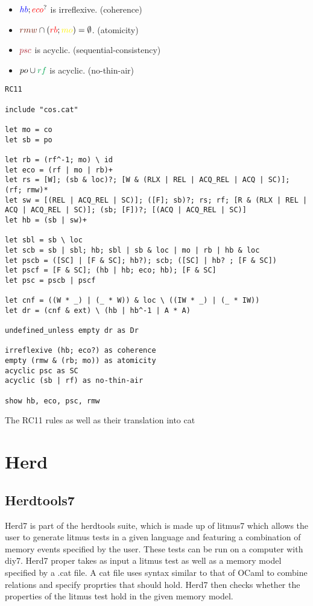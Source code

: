 \documentclass[a4,12pt]{article}
\newcommand{\hb}{{\color{blue}hb}}
\newcommand{\eco}{{\color{red}eco}}
\newcommand{\rmw}{{\color{Brown}rmw}}
\newcommand{\rb}{{\color{red}rb}}
\newcommand{\mo}{{\color{Yellow}mo}}
\newcommand{\psc}{{\color{Maroon}psc}}
\newcommand{\po}{po}
\newcommand{\rf}{{\color{Green}rf}}
\begin{document}
\begin{itemize}
\item $\hb ; \eco ^?$ is irreflexive. \hfill (coherence)
\item $\rmw \cap (\rb ; \mo) = \emptyset$. \hfill (atomicity)
\item $\psc$ is acyclic. \hfill (sequential-consistency)
\item $\po \cup \rf$ is acyclic. \hfill (no-thin-air)
\end{itemize}


\begin{lstlisting}[breaklines=true]
RC11

include "cos.cat"

let mo = co
let sb = po

let rb = (rf^-1; mo) \ id
let eco = (rf | mo | rb)+
let rs = [W]; (sb & loc)?; [W & (RLX | REL | ACQ_REL | ACQ | SC)]; (rf; rmw)*
let sw = [(REL | ACQ_REL | SC)]; ([F]; sb)?; rs; rf; [R & (RLX | REL | ACQ | ACQ_REL | SC)]; (sb; [F])?; [(ACQ | ACQ_REL | SC)]
let hb = (sb | sw)+

let sbl = sb \ loc
let scb = sb | sbl; hb; sbl | sb & loc | mo | rb | hb & loc
let pscb = ([SC] | [F & SC]; hb?); scb; ([SC] | hb? ; [F & SC])
let pscf = [F & SC]; (hb | hb; eco; hb); [F & SC]
let psc = pscb | pscf

let cnf = ((W * _) | (_ * W)) & loc \ ((IW * _) | (_ * IW))
let dr = (cnf & ext) \ (hb | hb^-1 | A * A)

undefined_unless empty dr as Dr

irreflexive (hb; eco?) as coherence
empty (rmw & (rb; mo)) as atomicity
acyclic psc as SC
acyclic (sb | rf) as no-thin-air

show hb, eco, psc, rmw
\end{lstlisting}
{\footnotesize{The RC11 rules as well as their translation into cat}}

\section{Herd}

\subsection{Herdtools7}

Herd7 is part of the herdtools suite, which is made up of litmus7 which allows the user to generate litmus tests in a given language and featuring a combination of memory events specified by the user. These tests can be run on a computer with diy7. Herd7 proper takes as input a litmus test as well as a memory model specified by a .cat file. A cat file uses syntax similar to that of OCaml to combine relations and specify proprties that should hold. Herd7 then checks whether the properties of the litmus test hold in the given memory model.
\end{document}

